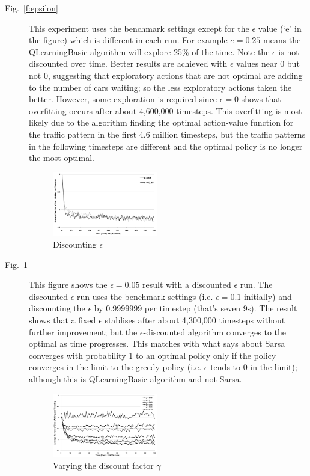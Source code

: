 \begin{description}
\item[Fig.~\ref{f:epsilon}]
This experiment uses the benchmark settings except for the $\epsilon$
value (`e' in the figure) which is different in each run. For example $e = 0.25$ means
the QLearningBasic algorithm will explore 25\% of the time.
Note the $\epsilon$ is not discounted over time.
Better results are achieved with $\epsilon$ values near 0 but not 0,
suggesting that exploratory actions
that are not optimal are adding to the number of cars waiting; so
the less exploratory actions taken the better. However, some exploration
is required since $\epsilon =0$ shows that overfitting occurs after
about 4,600,000 timesteps. This overfitting is most likely due to
the algorithm finding the optimal action-value function for the traffic
pattern in the first 4.6 million timesteps, but the traffic patterns
in the following timesteps are different and the optimal policy is
no longer the most optimal.



\begin{figure}
\centering
\includegraphics[width=0.45\textwidth]{e-soft}
\caption{Discounting $\epsilon$}\label{f:e-soft}
\end{figure}

\item[Fig.~\ref{f:e-soft}]
This figure shows the $\epsilon = 0.05$ result with a discounted
$\epsilon$ run. The discounted $\epsilon$ run uses the benchmark
settings (i.e. $\epsilon = 0.1$ initially) and discounting the
$\epsilon$ by 0.9999999 per timestep (that's seven 9s). The result shows
that a fixed $\epsilon$ stablises after about 4,300,000 timesteps
without further improvement; but the $\epsilon$-discounted algorithm
converges to the optimal as time progresses. This matches with what
\cite{Sutton_1998} says about Sarsa converges with probability
1 to an optimal policy only if the policy converges in the
limit to the greedy policy (i.e. $\epsilon$ tends to 0 in the limit);
although this is QLearningBasic algorithm and not Sarsa.




\begin{figure}
\centering
\includegraphics[width=0.45\textwidth]{discountFactor}
\caption{Varying the discount factor $\gamma$}\label{f:discountFactor}
\end{figure}


\end{description}
